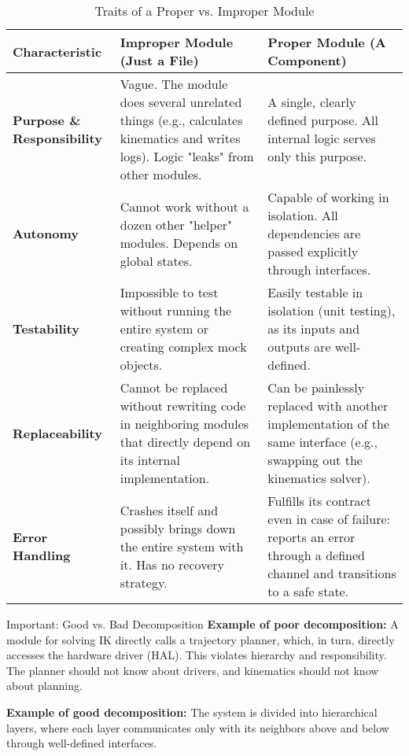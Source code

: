 \begin{table}[h!]
    \caption{Traits of a Proper vs. Improper Module}
    \label{tab:good_vs_bad_module}
    \centering
    \renewcommand{\arraystretch}{1.2}
    \begin{tabular}{p{} p{} p{}}
        \toprule %
        \textbf{Characteristic} & \textbf{Improper Module (Just a File)} & \textbf{Proper Module (A Component)} \\
        \toprule %
        \textbf{Purpose \& Responsibility} & Vague. The module does several unrelated things (e.g., calculates kinematics and writes logs). Logic "leaks" from other modules. & A single, clearly defined purpose. All internal logic serves only this purpose. \\
        \midrule %
        \textbf{Autonomy} & Cannot work without a dozen other "helper" modules. Depends on global states. & Capable of working in isolation. All dependencies are passed explicitly through interfaces. \\
        \midrule %
        \textbf{Testability} & Impossible to test without running the entire system or creating complex mock objects. & Easily testable in isolation (unit testing), as its inputs and outputs are well-defined. \\
        \midrule %
        \textbf{Replaceability} & Cannot be replaced without rewriting code in neighboring modules that directly depend on its internal implementation. & Can be painlessly replaced with another implementation of the same interface (e.g., swapping out the kinematics solver). \\
        \midrule %
        \textbf{Error Handling} & Crashes itself and possibly brings down the entire system with it. Has no recovery strategy. & Fulfills its contract even in case of failure: reports an error through a defined channel and transitions to a safe state. \\
        \bottomrule %
    \end{tabular}
\end{table}

\begin{principlebox}{Important: Good vs. Bad Decomposition}
\textbf{Example of poor decomposition:} A module for solving IK directly calls a trajectory planner, which, in turn, directly accesses the hardware driver (HAL). This violates hierarchy and responsibility. The planner should not know about drivers, and kinematics should not know about planning.

\textbf{Example of good decomposition:} The system is divided into hierarchical layers, where each layer communicates only with its neighbors above and below through well-defined interfaces.
\end{principlebox}

